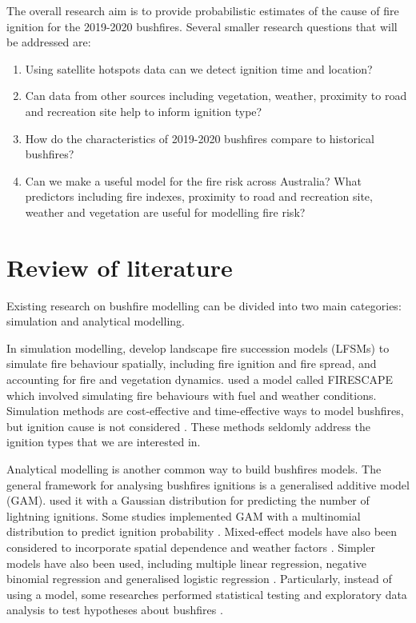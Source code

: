 \documentclass[11pt,a4paper,]{article}
\providecommand{\tightlist}{%
  \setlength{\itemsep}{0pt}\setlength{\parskip}{0pt}}
\begin{document}
The overall research aim is to provide probabilistic estimates of the cause of fire ignition for the 2019-2020 bushfires. Several smaller research questions that will be addressed are:

\begin{enumerate}
\def\labelenumi{\arabic{enumi}.}
\tightlist
\item
  Using satellite hotspots data can we detect ignition time and location?
\item
  Can data from other sources including vegetation, weather, proximity to road and recreation site help to inform ignition type?
\item
  How do the characteristics of 2019-2020 bushfires compare to historical bushfires?
\item
  Can we make a useful model for the fire risk across Australia? What predictors including fire indexes, proximity to road and recreation site, weather and vegetation are useful for modelling fire risk?
\end{enumerate}

\hypertarget{review-of-literature}{%
\section{Review of literature}\label{review-of-literature}}

Existing research on bushfire modelling can be divided into two main categories: simulation and analytical modelling.

In simulation modelling, \textcite{keane2004classification} develop landscape fire succession models (LFSMs) to simulate fire behaviour spatially, including fire ignition and fire spread, and accounting for fire and vegetation dynamics. \textcite{bradstock2012wildfires} used a model called FIRESCAPE which involved simulating fire behaviours with fuel and weather conditions. Simulation methods are cost-effective and time-effective ways to model bushfires, but ignition cause is not considered \autocite{clarke2019developing}. These methods seldomly address the ignition types that we are interested in.

Analytical modelling is another common way to build bushfires models. The general framework for analysing bushfires ignitions is a generalised additive model (GAM). \textcite{bates2018exploratory} used it with a Gaussian distribution for predicting the number of lightning ignitions. Some studies implemented GAM with a multinomial distribution to predict ignition probability \autocite{read2018lightning,zhang2017wildfire}. Mixed-effect models have also been considered to incorporate spatial dependence and weather factors \autocite{duff2018dryness}. Simpler models have also been used, including multiple linear regression, negative binomial regression and generalised logistic regression \autocite{cheney2012predicting,plucinski2014predicting,collins2015spatial}. Particularly, instead of using a model, some researches performed statistical testing and exploratory data analysis to test hypotheses about bushfires \autocite{miller2017electrically,dowdy2017pyrocumulonimbus}.
\end{document}
